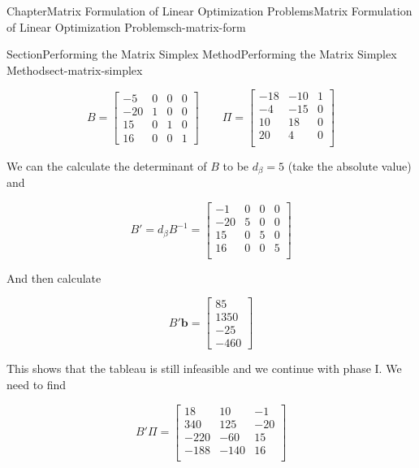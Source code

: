 \documentclass[oneside,10pt,]{book}
\numberwithin{equation}{section}
\newcommand{\amp}{&}
\begin{document}
\begin{chapterptx}{Chapter}{Matrix Formulation of Linear Optimization Problems}{}{Matrix Formulation of Linear Optimization Problems}{}{}{ch-matrix-form}
\begin{sectionptx}{Section}{Performing the Matrix Simplex Method}{}{Performing the Matrix Simplex Method}{}{}{sect-matrix-simplex}
\begin{introduction}{}
\begin{enumerate}
\begin{equation*}
B = \begin{bmatrix} -5 \amp 0 \amp 0 \amp 0 \\ -20 \amp 1 \amp 0 \amp 0 \\ 15 \amp 0 \amp 1 \amp 0 \\ 16 \amp 0 \amp 0 \amp 1 \end{bmatrix} \qquad \Pi = \begin{bmatrix} -18  \amp -10 \amp  1 \\ -4  \amp -15 \amp  0 \\ 10  \amp  18 \amp  0 \\ 20  \amp   4 \amp  0 \\ \end{bmatrix}
\end{equation*}
%
\par
We can the calculate the determinant of \(B\) to be \(d_{\beta} = 5\) (take the absolute value) and%
\par
%
\begin{equation*}
B' = d_{\beta} B^{-1} = \begin{bmatrix} -1 \amp  0 \amp  0 \amp  0 \\ -20 \amp 5 \amp  0 \amp  0 \\ 15 \amp  0 \amp 5 \amp  0 \\ 16 \amp  0 \amp  0 \amp 5 \\ \end{bmatrix}
\end{equation*}
%
\par
And then calculate%
\par
%
\begin{equation*}
B' \boldsymbol{b} = \begin{bmatrix}   85 \\ 1350 \\  -25 \\ -460 \end{bmatrix}
\end{equation*}
%
\par
This shows that the tableau is still infeasible and we continue with phase I. We need to find%
\par
%
\begin{equation*}
B'\Pi = \begin{bmatrix} 18 \amp   10 \amp  -1 \\ 340 \amp  125 \amp -20 \\ -220 \amp  -60 \amp  15 \\ -188 \amp -140 \amp  16 \\ \end{bmatrix}

\end{equation*}
\end{enumerate}
\end{introduction}
\end{sectionptx}
\end{chapterptx}
\end{document}
